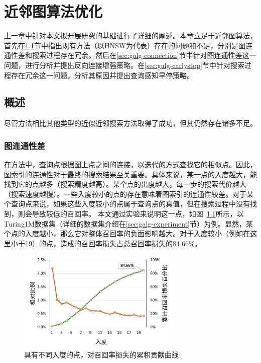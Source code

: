 
\chapter{近邻图算法优化}
上一章中针对本文拟开展研究的基础进行了详细的阐述。本章立足于近邻图算法，首先在\ref{sec:galg-overview}节中指出现有\ganns 方法（以HNSW为代表）存在的问题和不足，分别是图连通性差和搜索过程存在冗余。然后在\ref{sec:galg-connection}节中针对图连通性差这一问题，进行分析并提出反向连接增强策略。在\ref{sec:galg-earlystop}节中针对搜索过程存在冗余这一问题，分析其原因并提出查询感知早停策略。


\section{概述}\label{sec:galg-overview}
尽管\ganns 方法相比其他类型的近似近邻搜索方法取得了成功，但其仍然存在诸多不足。

\subsection{图连通性差}
在\ganns 方法中，查询点根据图上点之间的连接，以迭代的方式查找它的相似点。因此，图索引的连通性对于最终的搜索结果至关重要。具体来说，某一点的入度越大，能找到它的点越多（搜索精度越高）。某个点的出度越大，每一步的搜索代价越大（搜索速度越慢）。一些入度较小的点的存在意味着图索引的连通性较差。对于某个查询点来说，如果这些入度较小的点属于查询点的真值，但在搜索过程中没有找到，则会导致较低的召回率。
本文通过实验来说明这一点，如图~\ref{fig:percent-in-degree}所示，以Turing1M数据集（详细的数据集介绍在\ref{sec:galg-experiment}节）为例。显然，某个点的入度越小，那么它对整体召回率的负面影响越大。对于入度较小（例如在这里小于19）的点，造成的召回率损失占总召回率损失的84.66\%。
\begin{figure}[htbp]
  \centering
  \includegraphics[width=0.7\textwidth]{figures/context-1/percent-in-degree.pdf}
  \caption{具有不同入度的点，对召回率损失的累积贡献曲线}
  \label{fig:percent-in-degree}
\end{figure}

